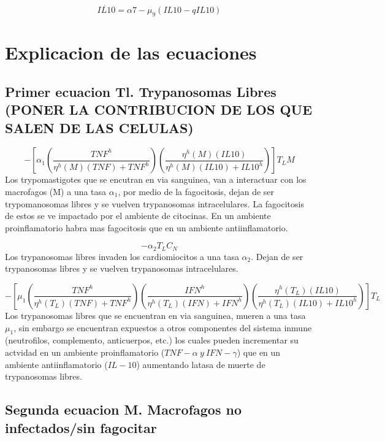 \documentclass[
]{article}
\begin{document}
\[ \dot{IL10}= \alpha{7}-\mu_{9}(IL10-qIL10) \]

\hypertarget{explicacion-de-las-ecuaciones}{%
\section{Explicacion de las
ecuaciones}\label{explicacion-de-las-ecuaciones}}

\hypertarget{primer-ecuacion-tl.-trypanosomas-libres-poner-la-contribucion-de-los-que-salen-de-las-celulas}{%
\subsection{Primer ecuacion Tl. Trypanosomas Libres (PONER LA
CONTRIBUCION DE LOS QUE SALEN DE LAS
CELULAS)}\label{primer-ecuacion-tl.-trypanosomas-libres-poner-la-contribucion-de-los-que-salen-de-las-celulas}}

\[ - [\alpha_{1}(\dfrac{TNF^{h}}{\eta^{h}(M)(TNF)+ TNF^{h}})(\dfrac{\eta^{h}(M)(IL10)}{\eta^{h}(M)(IL10)+IL10^{h}})]T_{L}M  \]
Los trypomastigotes que se encutran en via sanguinea, van a interactuar
con los macrofagos (M) a una tasa \(\alpha_{1}\), por medio de la
fagocitosis, dejan de ser trypomanosomas libres y se vuelven
trypanosomas intracelulares. La fagocitosis de estos se ve impactado por
el ambiente de citocinas. En un ambiente proinflamatorio habra mas
fagocitosis que en un ambiente antiinflamatorio.

\[-\alpha_{2}T_{L}C_{N}\] Los trypanosomas libres invaden los
cardiomiocitos a una tasa \(\alpha_{2}\). Dejan de ser trypanosomas
libres y se vuelven trypanosomas intracelulares.

\[- [\mu_{1}(\dfrac{TNF^{h}}{\eta^{h}(T_{L})(TNF)+TNF^{h}})(\dfrac{IFN^{h}}{\eta^{h}(T_{L})(IFN)+IFN^{h}})(\dfrac{\eta^{h}(T_{L})(IL10)}{\eta^{h}(T_{L})(IL10)+IL10^{h}})]T_{L}\]
Los trypanosomas libres que se encuentran en via sanguinea, mueren a una
tasa \(\mu_{1}\), sin embargo se encuentran expuestos a otros
componentes del sistema inmune (neutrofilos, complemento, anticuerpos,
etc.) los cuales pueden incrementar su actvidad en un ambiente
proinflamatorio (\(TNF-\alpha \ y \ IFN-\gamma\)) que en un ambiente
antiinflamatorio (\(IL-10\)) aumentando latasa de muerte de trypanosomas
libres.

\hypertarget{segunda-ecuacion-m.-macrofagos-no-infectadossin-fagocitar}{%
\subsection{Segunda ecuacion M. Macrofagos no infectados/sin
fagocitar}\label{segunda-ecuacion-m.-macrofagos-no-infectadossin-fagocitar}}
\end{document}
